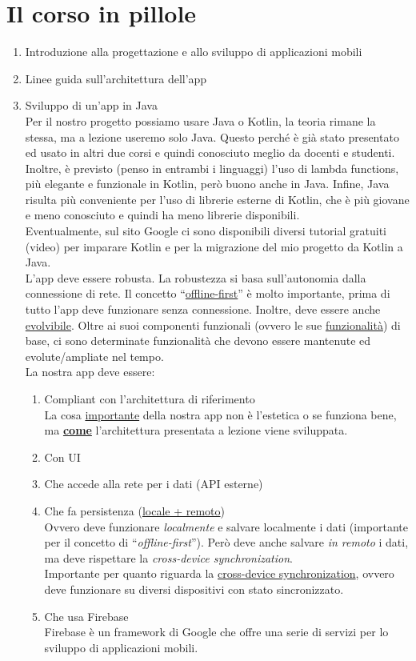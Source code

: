 \section{Il corso in pillole}
\begin{enumerate}
    \item Introduzione alla progettazione e allo sviluppo di applicazioni mobili
    \item Linee guida sull'architettura dell'app
    \item Sviluppo di un'app in Java\\
    Per il nostro progetto possiamo usare Java o Kotlin, la teoria rimane la stessa, ma a lezione useremo solo Java. Questo perché è già stato presentato ed usato in altri due corsi e quindi conosciuto meglio da docenti e studenti. Inoltre, è previsto (penso in entrambi i linguaggi) l'uso di lambda functions, più elegante e funzionale in Kotlin, però buono anche in Java. Infine, Java risulta più conveniente per l'uso di librerie esterne di Kotlin, che è più giovane e meno conosciuto e quindi ha meno librerie disponibili.\\
    Eventualmente, sul sito Google ci sono disponibili diversi tutorial gratuiti (video) per imparare Kotlin e per la migrazione del mio progetto da Kotlin a Java.\\
    L'app deve essere robusta. La robustezza si basa sull'autonomia dalla connessione di rete. Il concetto ``\underline{offline-first}'' è molto importante, prima di tutto l'app deve funzionare senza connessione. Inoltre, deve essere anche \underline{evolvibile}. Oltre ai suoi componenti funzionali (ovvero le sue \underline{funzionalità}) di base, ci sono determinate funzionalità che devono essere mantenute ed evolute/ampliate nel tempo.\\
    La nostra app deve essere:
    \begin{enumerate}
        \item Compliant con l'architettura di riferimento\\
        La cosa \underline{importante} della nostra app non è l'estetica o se funziona bene, ma \textbf{\underline{come}} l'architettura presentata a lezione viene sviluppata.
        \item Con UI
        \item Che accede alla rete per i dati (API esterne)
        \item Che fa persistenza (\underline{locale + remoto})\\
        Ovvero deve funzionare \textit{localmente} e salvare localmente i dati (importante per il concetto di ``\textit{offline-first}''). Però deve anche salvare \textit{in remoto} i dati, ma deve rispettare la \textit{cross-device synchronization}.\\
        Importante per quanto riguarda la \underline{cross-device synchronization}, ovvero deve funzionare su diversi dispositivi con stato sincronizzato.
        \item Che usa Firebase\\
        Firebase è un framework di Google che offre una serie di servizi per lo sviluppo di applicazioni mobili.
    \end{enumerate}
\end{enumerate}